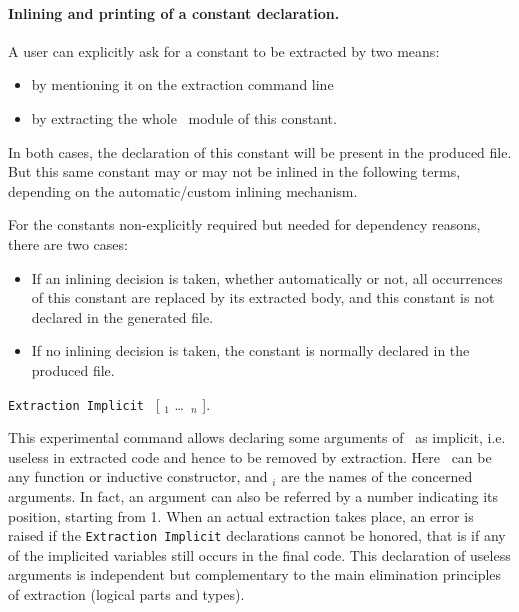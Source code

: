 \paragraph{Inlining and printing of a constant declaration.}

A user can explicitly ask for a constant to be extracted by two means:
\begin{itemize}
\item by mentioning it on the extraction command line
\item by extracting the whole \Coq\ module of this constant.
\end{itemize}
In both cases, the declaration of this constant will be present in the
produced file. 
But this same constant may or may not be inlined in the following
terms, depending on the automatic/custom inlining mechanism.  


For the constants non-explicitly required but needed for dependency
reasons, there are two cases: 
\begin{itemize}
\item If an inlining decision is taken, whether automatically or not,
all occurrences of this constant are replaced by its extracted body, and
this constant is not declared in the generated file.
\item If no inlining decision is taken, the constant is normally
  declared in the produced file. 
\end{itemize}


\begin{description}
\item {}
 {\tt Extraction Implicit} \qualid\ [ \ident$_1$ \dots\ \ident$_n$ ].

This experimental command allows declaring some arguments of
\qualid\ as implicit, i.e. useless in extracted code and hence to
be removed by extraction. Here \qualid\ can be any function or
inductive constructor, and \ident$_i$ are the names of the concerned
arguments. In fact, an argument can also be referred by a number
indicating its position, starting from 1. When an actual extraction
takes place, an error is raised if the {\tt Extraction Implicit}
declarations cannot be honored, that is if any of the implicited
variables still occurs in the final code. This declaration of useless
arguments is independent but complementary to the main elimination
principles of extraction (logical parts and types).
\end{description}

